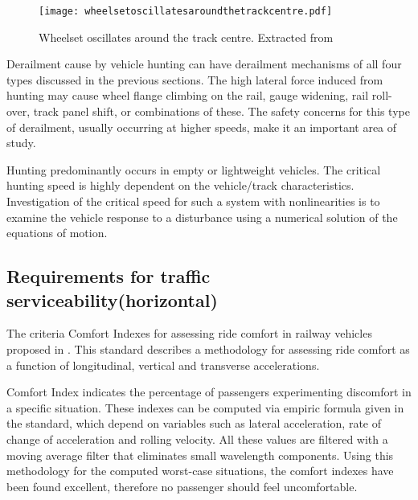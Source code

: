 \begin{figure}[h]
    \centering
    \texttt{[image: wheelsetoscillatesaroundthetrackcentre.pdf]}
    \caption{Wheelset oscillates around the track centre. Extracted from \citet[Figure8.28]{iwnicki2006handbook}}
    \label{fig:wheelsetoscillatesaroundthetrackcentre}
\end{figure}

Derailment cause by vehicle hunting can have derailment mechanisms of all four types discussed in the previous sections. The high lateral force induced from hunting may cause wheel flange climbing on the rail, gauge widening, rail roll-over, track panel shift, or combinations of these. The safety concerns for this type of derailment, usually occurring at higher speeds, make it an important area of study.

Hunting predominantly occurs in empty or lightweight vehicles. The critical hunting speed is highly dependent on the vehicle/track characteristics. Investigation of the critical speed for such a system with nonlinearities is to examine the vehicle response to a disturbance using a numerical solution of the equations of motion.

\subsection{Requirements for traffic serviceability(horizontal)}

The criteria Comfort Indexes for assessing ride comfort in railway vehicles proposed in \citet{12299}. This standard describes a methodology for assessing ride comfort as a function of longitudinal, vertical and transverse accelerations.

Comfort Index indicates the percentage of passengers experimenting discomfort in a specific situation. These indexes can be computed via empiric formula given in the standard, which depend on variables such as lateral acceleration, rate of change of acceleration and rolling velocity. All these values are filtered with a moving average filter that eliminates small wavelength components. Using this methodology for the computed worst-case situations, the comfort indexes have been found excellent, therefore no passenger should feel uncomfortable.
